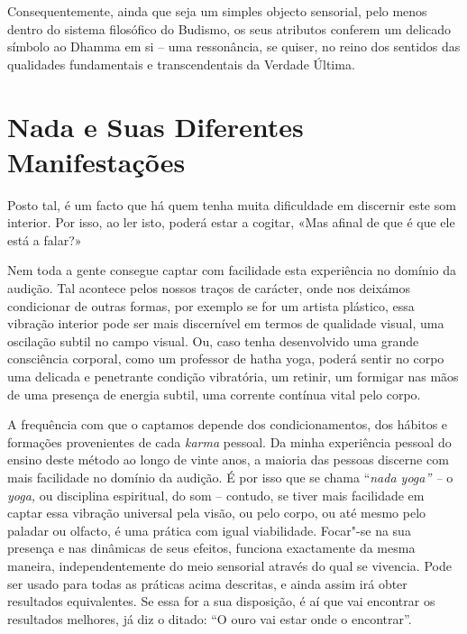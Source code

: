 Consequentemente, ainda que seja um simples objecto sensorial, pelo
menos dentro do sistema filosófico do Budismo, os seus atributos
conferem um delicado símbolo ao Dhamma em si -- uma ressonância, se
quiser, no reino dos sentidos das qualidades fundamentais e
transcendentais da Verdade Última.

\section{Nada e Suas Diferentes Manifestações}

Posto tal, é um facto que há quem tenha muita dificuldade em discernir
este som interior. Por isso, ao ler isto, poderá estar a cogitar, «Mas
afinal de que é que ele está a falar?»

Nem toda a gente consegue captar com facilidade esta experiência no
domínio da audição. Tal acontece pelos nossos traços de carácter, onde
nos deixámos condicionar de outras formas, por exemplo se for um artista
plástico, essa vibração interior pode ser mais discernível em termos de
qualidade visual, uma oscilação subtil no campo visual. Ou, caso tenha
desenvolvido uma grande consciência corporal, como um professor de hatha
yoga, poderá sentir no corpo uma delicada e penetrante condição
vibratória, um retinir, um formigar nas mãos de uma presença de energia
subtil, uma corrente contínua vital pelo corpo.

A frequência com que o captamos depende dos condicionamentos, dos
hábitos e formações provenientes de cada \emph{karma} pessoal. Da minha
experiência pessoal do ensino deste método ao longo de vinte anos, a
maioria das pessoas discerne com mais facilidade no domínio da audição.
É por isso que se chama ``\emph{nada yoga'' --} o \emph{yoga,} ou
disciplina espiritual, do som -- contudo, se tiver mais facilidade em
captar essa vibração universal pela visão, ou pelo corpo, ou até mesmo
pelo paladar ou olfacto, é uma prática com igual viabilidade. Focar"-se
na sua presença e nas dinâmicas de seus efeitos, funciona exactamente da
mesma maneira, independentemente do meio sensorial através do qual se
vivencia. Pode ser usado para todas as práticas acima descritas, e ainda
assim irá obter resultados equivalentes. Se essa for a sua disposição, é
aí que vai encontrar os resultados melhores, já diz o ditado: ``O ouro
vai estar onde o encontrar''.

